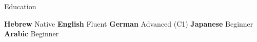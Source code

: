 \documentclass{resume} %
\begin{document}
\begin{rSection}{Education}
\begin{rSubsection}
		\setlength{\itemindent}{.5cm}
		
		\item[]\vspace{-0.6cm}%
	\end{rSubsection}
	
\end{rSection}


\vspace*{0.4cm}

\textbf{Hebrew} Native\qquad
\textbf{English} Fluent\qquad
\textbf{German} Advanced (C1)\qquad
\textbf{Japanese} Beginner\qquad
\textbf{Arabic} Beginner\qquad
\end{document}
